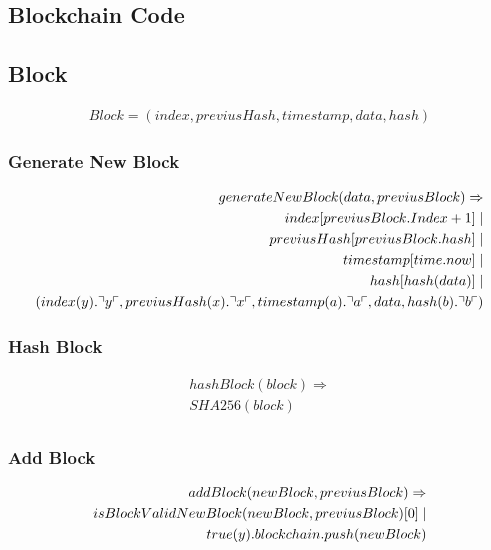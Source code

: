 \subsection{Blockchain Code}

\subsection{Block}
\begin{align*}
Block = (index, previusHash, timestamp, data, hash)
\end{align*}

\subsubsection{Generate New Block}

\begin{align*}
generateNewBlock(data, previusBlock)\Rightarrow \\
index[previusBlock.Index + 1]\mid\\
previusHash[previusBlock.hash] \mid \\
timestamp[time.now] \mid \\
hash[hash(data)] \mid \\
(index(y).\urcorner y \ulcorner, previusHash(x).\urcorner x \ulcorner, timestamp(a).\urcorner a \ulcorner, data, hash(b).\urcorner b \ulcorner)
\end{align*}

\subsubsection{Hash Block}

\begin{align*}
hashBlock(block)\Rightarrow\\
SHA256(block)\\
\end{align*}

\subsubsection{Add Block}

\begin{align*}
addBlock(newBlock, previusBlock) \Rightarrow\\
isBlockValidNewBlock(newBlock, previusBlock)[0]\mid \\
true(y).blockchain.push(newBlock)
\end{align*}